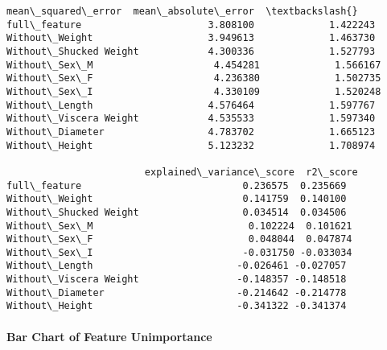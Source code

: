 \documentclass[11pt]{article}
\makeatletter
\newcommand{\boxspacing}{\kern\kvtcb@left@rule\kern\kvtcb@boxsep}
\newcommand{\prompt}[4]{
        {\ttfamily\llap{{\color{#2}[#3]:\hspace{3pt}#4}}\vspace{-\baselineskip}}
    }
\makeatother
\begin{document}
            \begin{tcolorbox}[breakable, size=fbox, boxrule=.5pt, pad at break*=1mm, opacityfill=0]
\prompt{Out}{outcolor}{120}{\boxspacing}
\begin{Verbatim}[commandchars=\\\{\}]
                        mean\_squared\_error  mean\_absolute\_error  \textbackslash{}
full\_feature                      3.808100             1.422243
Without\_Weight                    3.949613             1.463730
Without\_Shucked Weight            4.300336             1.527793
Without\_Sex\_M                     4.454281             1.566167
Without\_Sex\_F                     4.236380             1.502735
Without\_Sex\_I                     4.330109             1.520248
Without\_Length                    4.576464             1.597767
Without\_Viscera Weight            4.535533             1.597340
Without\_Diameter                  4.783702             1.665123
Without\_Height                    5.123232             1.708974

                        explained\_variance\_score  r2\_score
full\_feature                            0.236575  0.235669
Without\_Weight                          0.141759  0.140100
Without\_Shucked Weight                  0.034514  0.034506
Without\_Sex\_M                           0.102224  0.101621
Without\_Sex\_F                           0.048044  0.047874
Without\_Sex\_I                          -0.031750 -0.033034
Without\_Length                         -0.026461 -0.027057
Without\_Viscera Weight                 -0.148357 -0.148518
Without\_Diameter                       -0.214642 -0.214778
Without\_Height                         -0.341322 -0.341374
\end{Verbatim}
\end{tcolorbox}
        
    \paragraph{Bar Chart of Feature
Unimportance}\label{bar-chart-of-feature-unimportance}
\end{document}

